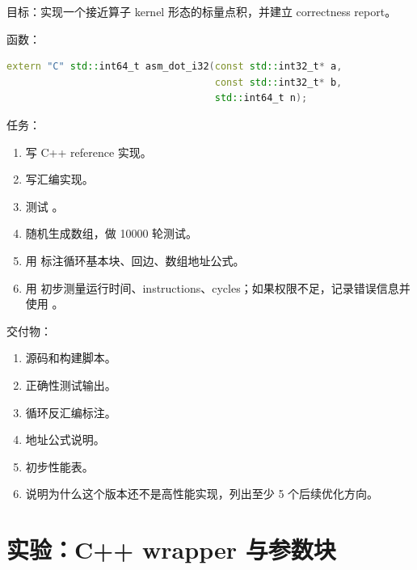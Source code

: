 \begin{labbox}
目标：实现一个接近算子 kernel 形态的标量点积，并建立 correctness report。

函数：

\begin{lstlisting}[language=C++]
extern "C" std::int64_t asm_dot_i32(const std::int32_t* a,
                                    const std::int32_t* b,
                                    std::int64_t n);
\end{lstlisting}

任务：

\begin{enumerate}
  \item 写 C++ reference 实现。
  \item 写汇编实现。
  \item 测试 。
  \item 随机生成数组，做 10000 轮测试。
  \item 用  标注循环基本块、回边、数组地址公式。
  \item 用  初步测量运行时间、instructions、cycles；如果权限不足，记录错误信息并使用 。
\end{enumerate}

交付物：

\begin{enumerate}
  \item 源码和构建脚本。
  \item 正确性测试输出。
  \item 循环反汇编标注。
  \item 地址公式说明。
  \item 初步性能表。
  \item 说明为什么这个版本还不是高性能实现，列出至少 5 个后续优化方向。
\end{enumerate}
\end{labbox}

\section{实验：C++ wrapper 与参数块}

